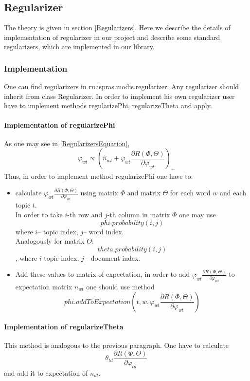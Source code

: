 \subsection{Regularizer}
    The theory is given in section \ref{Regularizers}. Here we describe the  details of implementation of regularizer in our project and describe some standard regularizers,
    which are implemented in our library.
    \subsubsection{Implementation}
	One can find regularizers in ru.ispras.modis.regularizer. Any regularizer should inherit from class Regularizer. In order to implement his own regularizer user have to implement methods
	regularizePhi, regularizeTheta and apply.
	\paragraph{Implementation of regularizePhi\\}
	As one may see in \ref{RegularizersEquation},
	\begin{equation} \varphi_{wt} \propto \left(\hat{n}_{wt} + \varphi_{wt} \frac{\partial  R(\Phi, \Theta)}{\partial \varphi_{wt}} \right)_+ \end{equation}
	Thus, in order to implement method regularizePhi one have to:
	\begin{itemize}
	    \item calculate $\varphi_{wt} \frac{\partial  R(\Phi, \Theta)}{\partial \varphi_{wt}}$ using matrix $\Phi$ and matrix $\Theta$ for each word $w$ and
		each topic $t$.\\
		In order to take $i$\--th row and $j$\--th column in matrix $\Phi$ one may use $$phi.probability(i, j)$$ where $i$\--- topic index,
		$j$\--- word index.\\
		Analogously for matrix $\Theta$: $$theta.probability(i, j)$$, where $i$\--topic index, $j$ \-- document index.
	    \item Add these values to matrix of expectation, in order to add $\varphi_{wt} \frac{\partial  R(\Phi, \Theta)}{\partial \varphi_{wt}}$ to
		expectation matrix $n_{wt}$ one should use method\\
		$$phi.addToExpectation(t, w, \varphi_{wt} \frac{\partial  R(\Phi, \Theta)}{\partial \varphi_{wt}})$$
	\end{itemize}
	
    \paragraph{Implementation of regularizeTheta \\}
	This method is analogous to the previous paragraph. One have to calculate $$ \theta_{td}\frac{\partial  R(\Phi, \Theta)}{\partial \varphi_{td}} $$
	and add it to expectation of $n_{dt}$.
